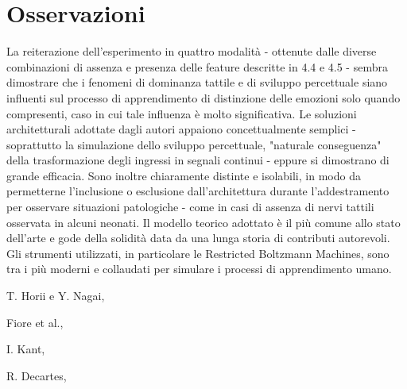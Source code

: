 \documentclass[10pt,letterpaper]{article}
\begin{document}
\section{Osservazioni}
La reiterazione dell'esperimento in quattro modalità - ottenute dalle diverse combinazioni di assenza e presenza delle feature descritte in 4.4 e 4.5 - sembra dimostrare che i fenomeni di dominanza tattile e di sviluppo percettuale siano influenti sul processo di apprendimento di distinzione delle emozioni solo quando compresenti, caso in cui tale influenza è molto significativa. Le soluzioni architetturali adottate dagli autori appaiono concettualmente semplici - soprattutto la simulazione dello sviluppo percettuale, "naturale conseguenza" della trasformazione degli ingressi in segnali continui - eppure si dimostrano di grande efficacia. Sono inoltre chiaramente distinte e isolabili, in modo da permetterne l'inclusione o esclusione dall'architettura durante l'addestramento per osservare situazioni patologiche - come in casi di assenza di nervi tattili osservata in alcuni neonati. Il modello teorico adottato è il più comune allo stato dell'arte e gode della solidità data da una lunga storia di contributi autorevoli. Gli strumenti utilizzati, in particolare le Restricted Boltzmann Machines, sono tra i più moderni e collaudati per simulare i processi di apprendimento umano.

\nolinenumbers

\newpage
\begin{thebibliography}{2}

T. Horii e Y. Nagai,

Fiore et al.,

I. Kant,

R. Decartes,

\end{thebibliography}
\end{document}
